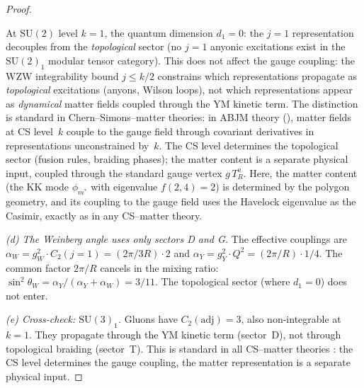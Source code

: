 \begin{proof}
\begin{remark}
At $\mathrm{SU}(2)$ level $k = 1$, the quantum dimension
$d_1 = 0$: the $j = 1$ representation decouples from the
\emph{topological} sector (no $j = 1$ anyonic excitations
exist in the $\mathrm{SU}(2)_1$ modular tensor category).
This does not affect the gauge coupling:
the WZW integrability bound
$j \le k/2$ constrains which representations propagate
as \emph{topological} excitations (anyons, Wilson loops),
not which representations appear as \emph{dynamical}
matter fields coupled through the YM kinetic term.
The distinction is standard in Chern--Simons--matter theories:
in ABJM theory (\citealt{ABJM2008}), matter fields
at CS level~$k$ couple to the gauge field
through covariant derivatives in representations
unconstrained by~$k$.
The CS level determines the topological sector
(fusion rules, braiding phases);
the matter content is a separate physical input,
coupled through the standard gauge vertex $g\,T^a_R$.
Here, the matter content (the KK mode $\phi_{m^*}$
with eigenvalue $f(2,4) = 2$) is determined by the
polygon geometry, and its coupling to the gauge field
uses the Havelock eigenvalue as the Casimir,
exactly as in any CS--matter theory.
\end{remark}

\emph{(d) The Weinberg angle uses only sectors D and G.}
The effective couplings are
$\alpha_W = g_W^2 \cdot C_2(j{=}1) = (2\pi/3R) \cdot 2$
and $\alpha_Y = g_Y^2 \cdot Q^2 = (2\pi/R) \cdot 1/4$.
The common factor $2\pi/R$ cancels in the mixing ratio:
$\sin^2\theta_W = \alpha_Y/(\alpha_Y + \alpha_W) = 3/11$.
The topological sector (where $d_1 = 0$) does not enter.

\emph{(e) Cross-check: $\mathrm{SU}(3)_1$.}
Gluons have $C_2(\mathrm{adj}) = 3$, also non-integrable at $k = 1$.
They propagate through the YM kinetic term (sector~D),
not through topological braiding (sector~T).
This is standard in all CS--matter theories
\citep{ABJM2008}: the CS level determines the gauge coupling,
the matter representation is a separate physical input.
\end{proof}

